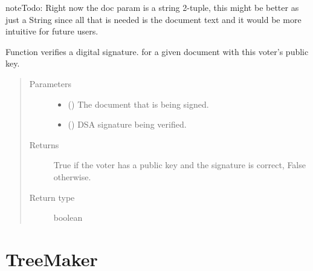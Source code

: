 \documentclass[letterpaper,10pt,english]{sphinxmanual}
\begin{document}
\begin{fulllineitems}
\begin{fulllineitems}
\begin{quote}
\begin{description}
\end{description}\end{quote}

\begin{sphinxadmonition}{note}{Todo:}
Right now the doc param is a string 2-tuple, this might be better as just a String since all
that is needed is the document text and it would be more intuitive for future users.
\end{sphinxadmonition}

\end{fulllineitems}


\begin{fulllineitems}
\label{\detokenize{index:Voter.Voter.verify}}
Function verifies a digital signature. for a given document with this voter’s public key.
\begin{quote}\begin{description}
\item[{Parameters}] \leavevmode\begin{itemize}
\item {} 
 () \textendash{} The document that is being signed.

\item {} 
 (\sphinxstyleliteralemphasis{, }) \textendash{} DSA signature being verified.

\end{itemize}

\item[{Returns}] \leavevmode
True if the voter has a public key and the signature is correct, False otherwise.

\item[{Return type}] \leavevmode
boolean

\end{description}\end{quote}

\end{fulllineitems}


\end{fulllineitems}

\label{\detokenize{index:module-TreeMaker}}

\chapter{TreeMaker}
\label{\detokenize{index:treemaker}}
\end{document}
